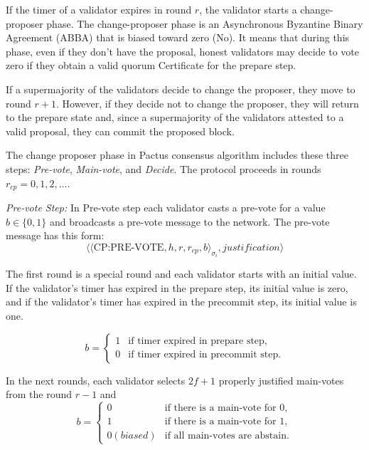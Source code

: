 \documentclass{novel}
\begin{document}
If the timer of a validator expires in round $r$, the validator starts a change-proposer phase. The change-proposer phase is an Asynchronous Byzantine Binary Agreement (ABBA) that is biased toward zero (No). It means that during this phase, even if they don’t have the proposal, honest validators may decide to vote zero if they obtain a valid quorum Certificate for the prepare step.

If a supermajority of the validators decide to change the proposer, they move to round $r+1$. However, if they decide not to change the proposer, they will return to the prepare state and, since a supermajority of the validators attested to a valid proposal, they can commit the proposed block.

The change proposer phase in Pactus consensus algorithm includes these three steps: \emph{Pre-vote}, \emph{Main-vote}, and \emph{Decide}. The protocol proceeds in rounds $r_{cp} = 0, 1, 2, \ldots$.

\noindent \emph{Pre-vote Step:} In Pre-vote step each validator casts a pre-vote for a value $b \in \{0, 1\}$ and broadcasts a pre-vote message to the network. The pre-vote message has this form:
\begin{equation*}
  \langle\langle \text{CP:PRE-VOTE},h,r,r_{cp},b \rangle_{\sigma_i}, justification\rangle
\end{equation*}

The first round is a special round and each validator starts with an initial value. If the validator’s timer has expired in the prepare step, its initial value is zero, and if the validator’s timer has expired in the precommit step, its initial value is one.

\begin{equation}
  b = \begin{cases}
        1 & \text{if timer expired in prepare step,} \\
        0 & \text{if timer expired in precommit step.}
      \end{cases}
\end{equation}

In the next rounds, each validator selects $2f+1$ properly justified main-votes from the round $r-1$ and
\begin{equation*}
  b = \begin{cases}
        0 & \text{if there is a main-vote for 0,} \\
        1 & \text{if there is a main-vote for 1,} \\
        0 (biased) & \text{if all main-votes are abstain.}
    \end{cases}
\end{equation*}
\end{document}
